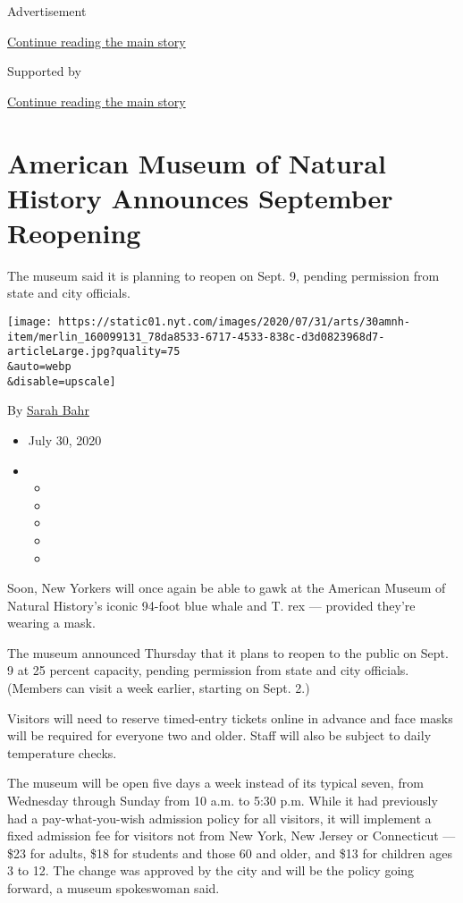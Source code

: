 Advertisement

\protect\hyperlink{after-top}{Continue reading the main story}

Supported by

\protect\hyperlink{after-sponsor}{Continue reading the main story}

\hypertarget{american-museum-of-natural-history-announces-september-reopening}{%
\section{American Museum of Natural History Announces September
Reopening}\label{american-museum-of-natural-history-announces-september-reopening}}

The museum said it is planning to reopen on Sept. 9, pending permission
from state and city officials.

\texttt{[image: https://static01.nyt.com/images/2020/07/31/arts/30amnh-item/merlin\_160099131\_78da8533-6717-4533-838c-d3d0823968d7-articleLarge.jpg?quality=75\\\&auto=webp\\\&disable=upscale]}

By \href{https://www.nytimes.com/by/sarah-bahr}{Sarah Bahr}

\begin{itemize}
\item
  July 30, 2020
\item
  \begin{itemize}
  \item
  \item
  \item
  \item
  \item
  \end{itemize}
\end{itemize}

Soon, New Yorkers will once again be able to gawk at the American Museum
of Natural History's iconic 94-foot blue whale and T. rex --- provided
they're wearing a mask.

The museum announced Thursday that it plans to reopen to the public on
Sept. 9 at 25 percent capacity, pending permission from state and city
officials. (Members can visit a week earlier, starting on Sept. 2.)

Visitors will need to reserve timed-entry tickets online in advance and
face masks will be required for everyone two and older. Staff will also
be subject to daily temperature checks.

The museum will be open five days a week instead of its typical seven,
from Wednesday through Sunday from 10 a.m. to 5:30 p.m. While it had
previously had a pay-what-you-wish admission policy for all visitors, it
will implement a fixed admission fee for visitors not from New York, New
Jersey or Connecticut --- \$23 for adults, \$18 for students and those
60 and older, and \$13 for children ages 3 to 12. The change was
approved by the city and will be the policy going forward, a museum
spokeswoman said.

